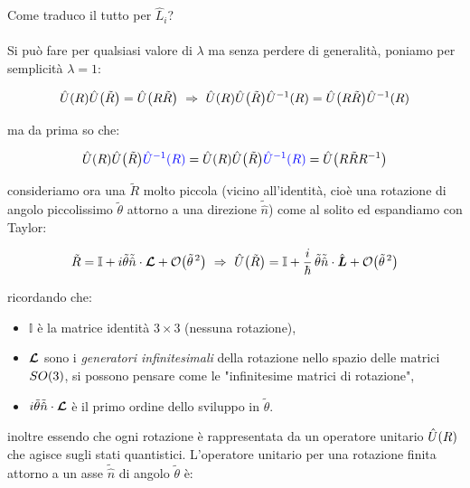 	Come traduco il tutto per $\hat{L}_i$?
	\\
	\\
	Si può fare per qualsiasi valore di $\lambda$ ma senza perdere di generalità, poniamo per semplicità $\lambda = 1$:

\begin{align*}
	\hat{U}\qty(R)\hat{U}\qty(\tilde{R}) = \hat{U}\qty(R\tilde{R}) \,\, \Rightarrow \,\,  \hat{U}\qty(R) \hat{U}\qty(\tilde{R}) \hat{U}^{-1}\qty(R)=  \hat{U}\qty(R\tilde{R}) \hat{U}^{-1}\qty(R)
\end{align*}

	ma da prima so che:
	
\begin{align*}
	 \hat{U}\qty(R) \hat{U}\qty(\tilde{R}) \textcolor{blue}{\hat{U}^{-1}\qty(R)} =  \hat{U}\qty(R)\hat{U}\qty(\tilde{R}) \textcolor{blue}{\hat{U}^{-1}\qty(R)}= \hat{U}\qty(R\tilde{R}R^{-1})
\end{align*}

	consideriamo ora una $\tilde{R}$ molto piccola (vicino all'identità, cioè una rotazione di angolo piccolissimo $\tilde{\theta}$ attorno a una direzione $\tilde{\hat{n}}$) come al solito ed espandiamo con Taylor:
	
\begin{align*}
	\tilde{R} = \mathbb{I} + i\tilde{\theta}\tilde{\hat{n}} \cdot \vb*{\mathcal{L}} + \order{\tilde{\theta}^{\,2}} \,\, \Rightarrow \,\, \hat{U}\qty(\tilde{R}) = \mathbb{I} + \frac{i}{\hbar} \, \tilde{\theta}\tilde{\hat{n}} \cdot \hat{\vb*{L}} + \order{\tilde{\theta}^{\, 2}}
\end{align*}

	ricordando che:
	
\begin{itemize}
	\item $\mathbb{I}$ è la matrice identità $3 \times 3$ (nessuna rotazione),
	\item $\vb*{\mathcal{L}}$ sono i \textit{generatori infinitesimali} della rotazione nello spazio delle matrici $SO\qty(3)$, si possono pensare come le "infinitesime matrici di rotazione",
	\item $i\tilde{\theta}\tilde{\hat{n}} \cdot \vb*{\mathcal{L}}$ è il primo ordine dello sviluppo in $\tilde{\theta}$.
\end{itemize}

	inoltre essendo che ogni rotazione è rappresentata da un operatore unitario $\hat{U}\qty(R)$ che agisce sugli stati quantistici. L'operatore unitario per una rotazione finita attorno a un asse $\tilde{\hat{n}}$ di angolo $\tilde{\theta}$ è:
	
